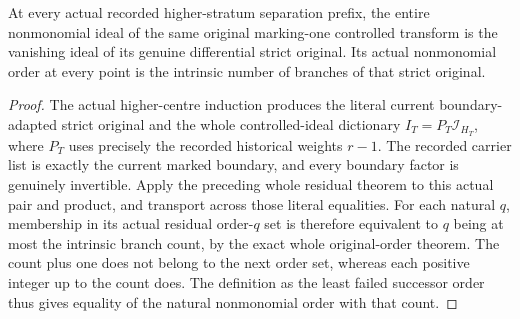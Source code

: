 \begin{theorem}
\label{hir:general-nc-actual-prefix-first-entry}
\leanok
At every actual recorded higher-stratum separation prefix, the entire
nonmonomial ideal of the same original marking-one controlled transform
is the vanishing ideal of its genuine differential strict original.
Its actual nonmonomial order at every point is the intrinsic number of
branches of that strict original.
\end{theorem}
\begin{proof}
The actual higher-centre induction produces the literal current
boundary-adapted strict original and the whole controlled-ideal
dictionary $I_T=P_T\mathcal I_{H_T}$, where $P_T$ uses precisely the
recorded historical weights $r-1$. The recorded carrier list is exactly
the current marked boundary, and every boundary factor is genuinely
invertible. Apply the preceding whole residual theorem to this actual
pair and product, and transport across those literal equalities. For
each natural $q$, membership in its actual residual order-$q$ set is
therefore equivalent to $q$ being at most the intrinsic branch count,
by the exact whole original-order theorem. The count plus one does not
belong to the next order set, whereas each positive integer up to the
count does. The definition as the least failed successor order thus
gives equality of the natural nonmonomial order with that count.
\end{proof}

